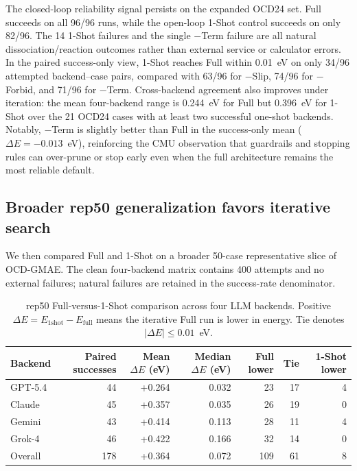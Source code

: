 The closed-loop reliability signal persists on the expanded OCD24 set.
Full succeeds on all 96/96 runs, while the open-loop 1-Shot control succeeds on only 82/96.
The 14 1-Shot failures and the single $-$Term failure are all natural dissociation/reaction outcomes rather than external service or calculator errors.
In the paired success-only view, 1-Shot reaches Full within 0.01~eV on only 34/96 attempted backend--case pairs, compared with 63/96 for $-$Slip, 74/96 for $-$Forbid, and 71/96 for $-$Term.
Cross-backend agreement also improves under iteration: the mean four-backend range is 0.244~eV for Full but 0.396~eV for 1-Shot over the 21 OCD24 cases with at least two successful one-shot backends.
Notably, $-$Term is slightly better than Full in the success-only mean ($\Delta E = -0.013$~eV), reinforcing the CMU observation that guardrails and stopping rules can over-prune or stop early even when the full architecture remains the most reliable default.

\subsection{Broader rep50 generalization favors iterative search}

We then compared Full and 1-Shot on a broader 50-case representative slice of OCD-GMAE.
The clean four-backend matrix contains 400 attempts and no external failures; natural failures are retained in the success-rate denominator.

\begin{table}[t]
\centering
\scriptsize
\caption{rep50 Full-versus-1-Shot comparison across four LLM backends. Positive $\Delta E = E_{\mathrm{1shot}} - E_{\mathrm{full}}$ means the iterative Full run is lower in energy. Tie denotes $|\Delta E| \leq 0.01$~eV.}
\label{tab:rep50-four-backend-summary}
\begin{tabular}{lrrrrrr}
\toprule
Backend & Paired successes & Mean $\Delta E$ (eV) & Median $\Delta E$ (eV) & Full lower & Tie & 1-Shot lower \\
\midrule
GPT-5.4 & 44 & +0.264 & 0.032 & 23 & 17 & 4 \\
Claude & 45 & +0.357 & 0.035 & 26 & 19 & 0 \\
Gemini & 43 & +0.414 & 0.113 & 28 & 11 & 4 \\
Grok-4 & 46 & +0.422 & 0.166 & 32 & 14 & 0 \\
Overall & 178 & +0.364 & 0.072 & 109 & 61 & 8 \\
\bottomrule
\end{tabular}
\end{table}

